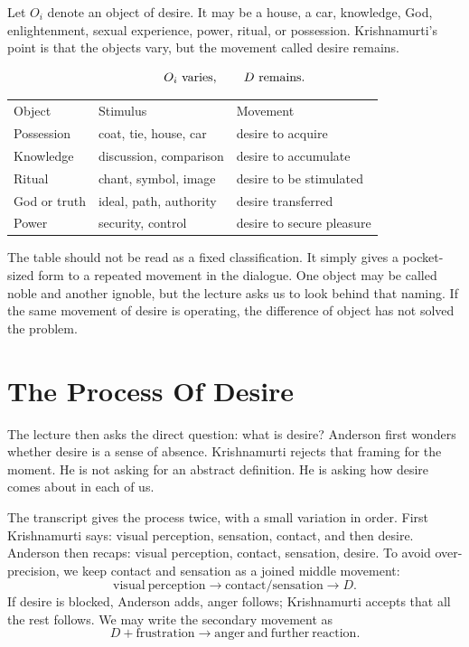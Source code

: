 Let \(O_i\) denote an object of desire. It may be a house, a car, knowledge, God, enlightenment, sexual experience, power, ritual, or possession. Krishnamurti's point is that the objects vary, but the movement called desire remains.

\begin{equation}
O_i \ \hbox{varies},
\qquad
D \ \hbox{remains}.
\end{equation}

\begin{table}
\centering
\begin{tabular}{lll}
Object & Stimulus & Movement \\
Possession & coat, tie, house, car & desire to acquire \\
Knowledge & discussion, comparison & desire to accumulate \\
Ritual & chant, symbol, image & desire to be stimulated \\
God or truth & ideal, path, authority & desire transferred \\
Power & security, control & desire to secure pleasure
\end{tabular}
\end{table}

The table should not be read as a fixed classification. It simply gives a pocket-sized form to a repeated movement in the dialogue. One object may be called noble and another ignoble, but the lecture asks us to look behind that naming. If the same movement of desire is operating, the difference of object has not solved the problem.

\section{The Process Of Desire}

The lecture then asks the direct question: what is desire? Anderson first wonders whether desire is a sense of absence. Krishnamurti rejects that framing for the moment. He is not asking for an abstract definition. He is asking how desire comes about in each of us.

The transcript gives the process twice, with a small variation in order. First Krishnamurti says: visual perception, sensation, contact, and then desire. Anderson then recaps: visual perception, contact, sensation, desire. To avoid over-precision, we keep contact and sensation as a joined middle movement:
\begin{equation}
\mathrm{visual\ perception}
\longrightarrow
\mathrm{contact/sensation}
\longrightarrow
D.
\end{equation}
If desire is blocked, Anderson adds, anger follows; Krishnamurti accepts that all the rest follows. We may write the secondary movement as
\begin{equation}
D + \mathrm{frustration}
\longrightarrow
\mathrm{anger\ and\ further\ reaction}.
\end{equation}

